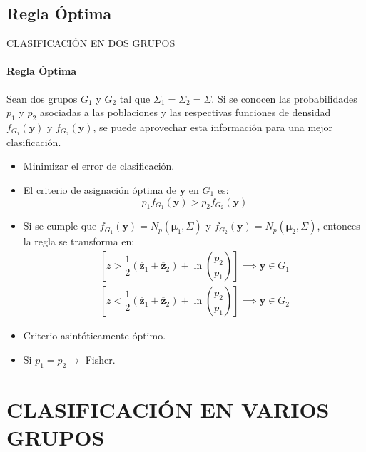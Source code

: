 \subsection{Regla Óptima}
\begin{frame}{CLASIFICACIÓN EN DOS GRUPOS}
\framesubtitle{Regla Óptima}
Sean dos grupos $G_1$ y $G_2$ tal que $\Sigma_1=\Sigma_2=\Sigma$. Si se conocen las probabilidades $p_1$ y $p_2$ asociadas a las poblaciones y las respectivas funciones de densidad $f_{G_1}(\mathbf{y})$ y $f_{G_2}(\mathbf{y})$, se puede aprovechar esta información para una mejor clasificación.

\begin{itemize}
    \item Minimizar el error de clasificación. \item El criterio de asignación óptima de $\mathbf{y}$ en $G_1$ es:
    \begin{equation}
        p_1f_{G_1}(\mathbf{y})>p_2f_{G_2}(\mathbf{y})
    \end{equation}
    \item Si se cumple que $f_{G_1}(\mathbf{y})=N_p(\pmb{\mu}_1,\Sigma)$ y $f_{G_2}(\mathbf{y})=N_p(\pmb{\mu}_2,\Sigma)$, entonces la regla se transforma en:
    \begin{align*}
        \left[z>\dfrac{1}{2}\left(\mathbf{\overbar{z}}_1+\mathbf{\overbar{z}}_2\right)+\ln\left(\dfrac{p_2}{p_1}\right)\right]\implies \mathbf{y}\in G_1\\
        \left[z<\dfrac{1}{2}\left(\mathbf{\overbar{z}}_1+\mathbf{\overbar{z}}_2\right)+\ln\left(\dfrac{p_2}{p_1}\right)\right]\implies \mathbf{y}\in G_2
    \end{align*}
    \item Criterio asintóticamente óptimo. \item Si $p_1=p_2\rightarrow$ Fisher.
    
\end{itemize}

\end{frame}

\section{CLASIFICACIÓN EN VARIOS GRUPOS}
